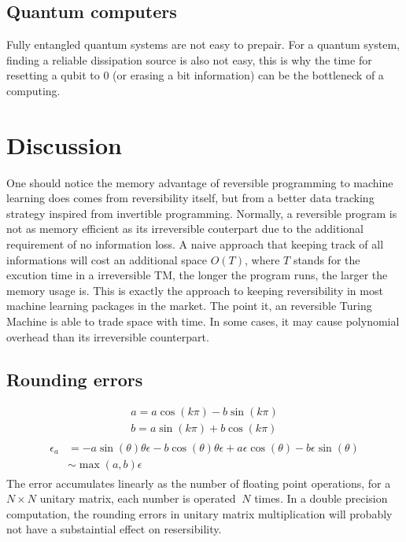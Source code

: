 \documentclass[aps,twocolumn,longbibliography,english,superscriptaddress,prr]{revtex4-1}
\newcommand{\<}{\langle}
\renewcommand{\>}{\rangle}
\begin{document}
\subsection{Quantum computers}
Fully entangled quantum systems are not easy to prepair.
For a quantum system, finding a reliable dissipation source is also not easy,
this is why the time for resetting a qubit to $0$ (or erasing a bit information) can be the bottleneck of a computing.

\section{Discussion}
One should notice the memory advantage of reversible programming to machine learning does comes from reversibility itself, but from a better data tracking strategy inspired from invertible programming.
Normally, a reversible program is not as memory efficient as its irreversible couterpart due to the additional requirement of no information loss. A naive approach that keeping track of all informations will cost an additional space $O(T)$, where $T$ stands for the excution time in a irreversible TM, the longer the program runs, the larger the memory usage is. This is exactly the approach to keeping reversibility in most machine learning packages in the market.
The point it, an reversible Turing Machine is able to trade space with time.
In some cases, it may cause polynomial overhead than its irreversible counterpart.

\subsection{Rounding errors}
\begin{align}
    a = a\cos(k\pi) - b\sin(k\pi)\\
    b = a\sin(k\pi) + b\cos(k\pi)
\end{align}
\begin{align}
    \begin{split}
    \epsilon_a &= -a\sin(\theta)\theta\epsilon - b\cos(\theta)\theta\epsilon + a\epsilon\cos(\theta) - b\epsilon\sin(\theta)\\
            &\sim \max(a ,b)\epsilon
    \end{split}
\end{align}
The error accumulates linearly as the number of floating point operations, for a $N\times N$ unitary matrix, each number is operated $~N$ times.
In a double precision computation, the rounding errors in unitary matrix multiplication will probably not have a substaintial effect on resersibility.
\end{document}
